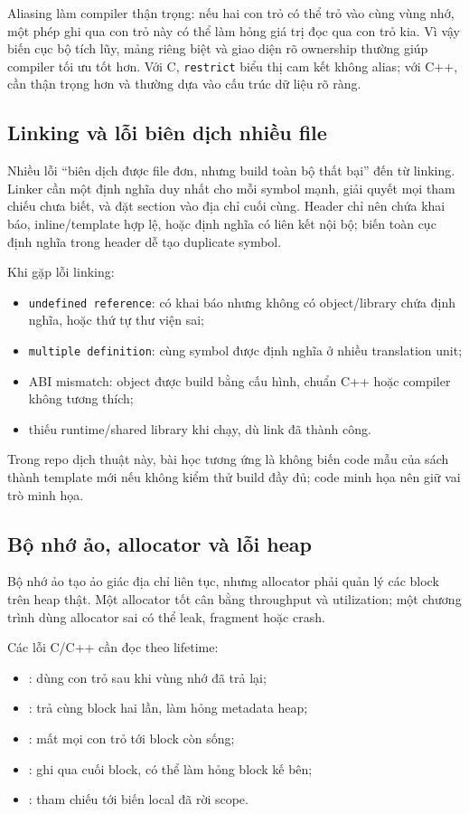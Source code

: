 \documentclass[11pt]{article}
\begin{document}
Aliasing làm compiler thận trọng: nếu hai con trỏ có thể trỏ vào cùng vùng nhớ,
một phép ghi qua con trỏ này có thể làm hỏng giá trị đọc qua con trỏ kia. Vì
vậy biến cục bộ tích lũy, mảng riêng biệt và giao diện rõ ownership thường giúp
compiler tối ưu tốt hơn. Với C, \texttt{restrict} biểu thị cam kết không alias;
với C++, cần thận trọng hơn và thường dựa vào cấu trúc dữ liệu rõ ràng.

\subsection{Linking và lỗi biên dịch nhiều file}

Nhiều lỗi ``biên dịch được file đơn, nhưng build toàn bộ thất bại'' đến từ
linking. Linker cần một định nghĩa duy nhất cho mỗi symbol mạnh, giải quyết mọi
tham chiếu chưa biết, và đặt section vào địa chỉ cuối cùng. Header chỉ nên chứa
khai báo, inline/template hợp lệ, hoặc định nghĩa có liên kết nội bộ; biến toàn
cục định nghĩa trong header dễ tạo duplicate symbol.

Khi gặp lỗi linking:
\begin{itemize}
  \item \texttt{undefined reference}: có khai báo nhưng không có object/library
        chứa định nghĩa, hoặc thứ tự thư viện sai;
  \item \texttt{multiple definition}: cùng symbol được định nghĩa ở nhiều
        translation unit;
  \item ABI mismatch: object được build bằng cấu hình, chuẩn C++ hoặc compiler
        không tương thích;
  \item thiếu runtime/shared library khi chạy, dù link đã thành công.
\end{itemize}

Trong repo dịch thuật này, bài học tương ứng là không biến code mẫu của sách
thành template mới nếu không kiểm thử build đầy đủ; code minh họa nên giữ vai
trò minh họa.

\subsection{Bộ nhớ ảo, allocator và lỗi heap}

Bộ nhớ ảo tạo ảo giác địa chỉ liên tục, nhưng allocator phải quản lý các block
trên heap thật. Một allocator tốt cân bằng throughput và utilization; một
chương trình dùng allocator sai có thể leak, fragment hoặc crash.

Các lỗi C/C++ cần đọc theo lifetime:
\begin{itemize}
  \item {}: dùng con trỏ sau khi vùng nhớ đã trả lại;
  \item {}: trả cùng block hai lần, làm hỏng metadata heap;
  \item {}: mất mọi con trỏ tới block còn sống;
  \item {}: ghi qua cuối block, có thể làm hỏng block kế bên;
  \item {}: tham chiếu tới biến local đã rời scope.
\end{itemize}
\end{document}
